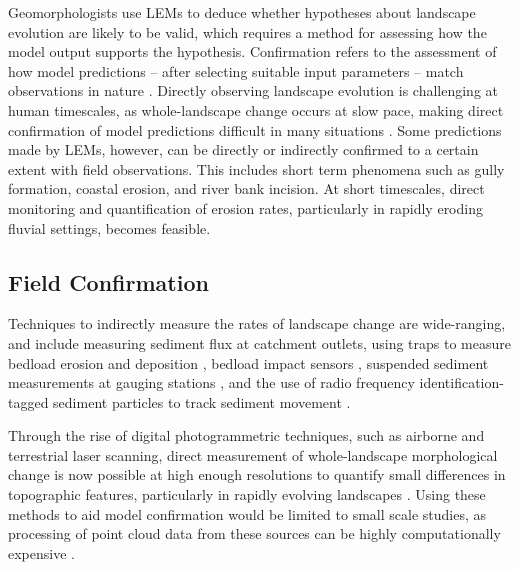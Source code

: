 Geomorphologists use LEMs to deduce whether hypotheses about landscape evolution are likely to be valid, which requires a method for assessing how the model output supports the hypothesis. Confirmation refers to the assessment of how model predictions -- after selecting suitable input parameters -- match observations in nature \citep{oreskes1994verification}. Directly observing landscape evolution is challenging at human timescales, as whole-landscape change occurs at slow pace, making direct confirmation of model predictions difficult in many situations \citep{Hasbargen2003,hoey2003testing}. Some predictions made by LEMs, however, can be directly or indirectly confirmed to a certain extent with field observations. This includes short term phenomena such as gully formation, coastal erosion, and river bank incision. At short timescales, direct monitoring and quantification of erosion rates, particularly in rapidly eroding fluvial settings, becomes feasible. 

\subsection{Field Confirmation}
Techniques to indirectly measure the rates of landscape change are wide-ranging, and include measuring sediment flux at catchment outlets, using traps to measure bedload erosion and deposition \citep{Bunte2004}, bedload impact sensors \citep{rickenmann2007continuous,turowski2010partitioning}, suspended sediment measurements at gauging stations \citep{brazier2004quantifying}, and the use of radio frequency identification-tagged sediment particles to track sediment movement \citep{chapuis2015coupling,Beer2015}.

Through the rise of digital photogrammetric techniques, such as airborne and terrestrial laser scanning, direct measurement of whole-landscape morphological change is now possible at high enough resolutions to quantify small differences in topographic features, particularly in rapidly evolving landscapes \citep{rosser2005terrestrial,vaaja2011mapping}. Using these methods to aid model confirmation would be limited to small scale studies, as processing of point cloud data from these sources can be highly computationally expensive \citep{axelsson1999processing}. 

